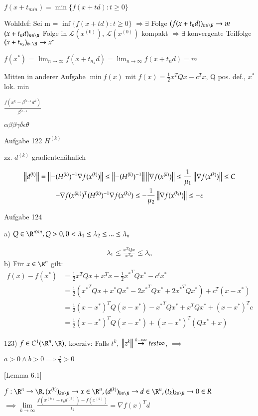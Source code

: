 \documentclass[12pt]{article}   %
\begin{document}
$f(x + t_{min}) = \min\{f(x+td) : t \geq 0\}$

Wohldef: Sei m = $\inf\{f(x+td) : t \geq 0 \}$ 
\newline$\Rightarrow\exists$ Folge $(f(x+t_nd))_{n\in\N} \to m$
\\$(x+t_nd)_{n\in\N}$ Folge in $\mathcal{L}(x^{(0)})$, $\mathcal{L}(x^{(0)})$ kompakt
\newline$\Rightarrow\exists$ konvergente Teilfolge $(x+t_{n_k})_{k\in\N}\to x^*$

$f(x^*)$ = $\lim_{n \to \infty} f(x+t_{n_k}d) = \lim_{n\to\infty}f(x+t_nd) = m$

Mitten in anderer Aufgabe
$\min f(x)$ mit $f(x) = \frac12 x^TQx-c^Tx$, Q pos. def., $x^*$ lok. min

$\frac{f(x^k-\beta^{l_{k-1}}d^k)}{\beta^{l_{k-1}}}$

$\alpha\beta\beta\gamma\delta\epsilon\theta$

Aufgabe 122
$H^{(k)}$


zz. $d^{(k)}$ gradientenähnlich

\begin{gather}
\left\lVert d^{(k)}\right\rVert = \left\lVert-(H^{(k)})^{-1}  \nabla f(x^{(k)})\right\rVert \leq \left\lVert-(H^{(k)})^{-1}\right\rVert \left\lVert\nabla f(x^{(k)})\right\rVert \leq \frac 1{\mu_1} \left\lVert\nabla f(x^{(k)})\right\rVert \leq C  \\
-\nabla f(x^{(k_t)})^T(H^{(k)})^{-1}\nabla f(x^{(k_t)}) \leq -\frac 1{\mu_2}\left\lVert\nabla f(x^{(k_t)})\right\rVert \leq -\varepsilon
\end{gather}

\vspace{3cm}
Aufgabe 124

a) $Q \in \R^{n\times n}, Q > 0, 0 < \lambda_1 \leq \lambda_2 \leq ... \leq \lambda_n$

\begin{gather}
\lambda_1 \leq \frac{x^TQx}{x^Tx} \leq \lambda_n
\end{gather}
b) Für $x\in\R^n$ gilt:
\begin{align}
f(x)-f(x^*) &= \frac12x^TQx+x^Tx-\frac12{x^*}^TQx^*-c^tx^* \\
&= \frac12({x^*}^TQx+x^*Qx^*-2{x^*}^TQx^*+2{x^*}^TQx^*) + c^T(x-x^*) \\
&= \frac12(x-x^*)^TQ(x-x^*) - {x^*}^TQx^*+x^TQx^*+(x-x^*)^Tc \\
&= \frac12(x-x^*)^TQ(x-x^*)+ (x-x^*)^T(Qx^*+x)
\end{align}



123)
$f \in C^1(\R^n, \R)$, koerziv: Falls ${t^k}$, $\left\lVert z^k\right\rVert \overset{k\to\infty}{\to}{test} \infty $, \newline
$\implies$
\blindtext

$a > 0 \land b > 0 \implies \frac ab > 0$

[Lemma 6.1]

$f:\R^n\to\R, (x^{(k)})_{k\in\N} \to x \in \R^n, (d^{(k)})_{k\in\N} \to d \in \R^n, (t_k)_{k\in\N} \to 0 \in R$ \\
$\implies \underset{k\to\infty}{\lim} \frac{f(x^{(k)}+t_kd^{(k)}) - f(x^{(k)})}{t_k} = \nabla {f(x)}^Td$
\end{document}

